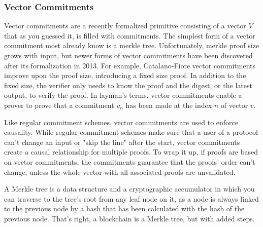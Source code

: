 \subsubsection{Vector Commitments}
Vector commitments are a recently formalized primitive consisting of a vector \(V\) that as you guessed it, is filled with commitments. The simplest form of a vector commitment most already know is a merkle tree. Unfortunately, merkle proof size grows with input, but newer forms of vector commitments have been discovered after its formalization in 2013. For example, Catalano-Fiore vector commitments improve upon the proof size, introducing a fixed size proof. In addition to the fixed size, the verifier only needs to know the proof and the digest, or the latest output, to verify the proof. In layman's terms, vector commitments enable a prover to prove that a commitment \(v_n\) has been made at the index \(n\) of vector \(v\).


Like regular commitment schemes, vector commitments are used to enforce causality. While regular commitment schemes make sure that a user of a protocol can't change an input or "skip the line" after the start, vector commitments create a causal relationship for multiple proofs. To wrap it up, if proofs are based on vector commitments, the commitments guarantee that the proofs' order can't change, unless the whole vector with all associated proofs are unvalidated.

A Merkle tree is a data structure and a cryptographic accumulator in which you can traverse to the tree's root from any leaf node on it, as a node is always linked to the previous node by a hash that has been calculated with the hash of the previous node. That's right, a blockchain is a Merkle tree, but with added steps.

